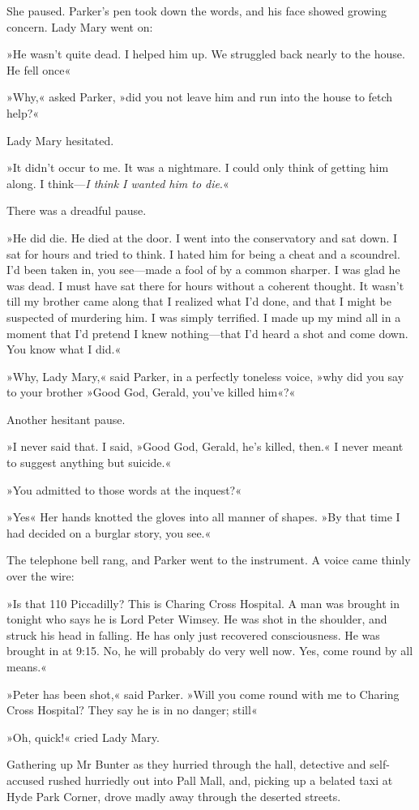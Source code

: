 She paused. Parker's pen took down the words, and his face showed growing concern. Lady Mary went on:

»He wasn't quite dead. I helped him up. We struggled back nearly to the house. He fell once\longdash«

»Why,« asked Parker, »did you not leave him and run into the house to fetch help?«

Lady Mary hesitated.

»It didn't occur to me. It was a nightmare. I could only think of getting him along. I think---\textit{I think I wanted him to die}.«

There was a dreadful pause.

»He did die. He died at the door. I went into the conservatory and sat down. I sat for hours and tried to think. I hated him for being a cheat and a scoundrel. I'd been taken in, you see\allowbreak---\allowbreak made a fool of by a common sharper. I was glad he was dead. I must have sat there for hours without a coherent thought. It wasn't till my brother came along that I realized what I'd done, and that I might be suspected of murdering him. I was simply terrified. I made up my mind all in a moment that I'd pretend I knew nothing\allowbreak---\allowbreak that I'd heard a shot and come down. You know what I did.«

»Why, Lady Mary,« said Parker, in a perfectly toneless voice, »why did you say to your brother »Good God, Gerald, you've killed him«?«

Another hesitant pause.

»I never said that. I said, »Good God, Gerald, he's killed, then.« I never meant to suggest anything but suicide.«

»You admitted to those words at the inquest?«

»Yes\longdash« Her hands knotted the gloves into all manner of shapes. »By that time I had decided on a burglar story, you see.«

The telephone bell rang, and Parker went to the instrument. A voice came thinly over the wire:

»Is that 110 Piccadilly? This is Charing Cross Hospital. A man was brought in tonight who says he is Lord Peter Wimsey. He was shot in the shoulder, and struck his head in falling. He has only just recovered consciousness. He was brought in at 9:15. No, he will probably do very well now. Yes, come round by all means.«

»Peter has been shot,« said Parker. »Will you come round with me to Charing Cross Hospital? They say he is in no danger; still\longdash«

»Oh, quick!« cried Lady Mary.

Gathering up Mr Bunter as they hurried through the hall, detective and self-accused rushed hurriedly out into Pall Mall, and, picking up a belated taxi at Hyde Park Corner, drove madly away through the deserted streets.
